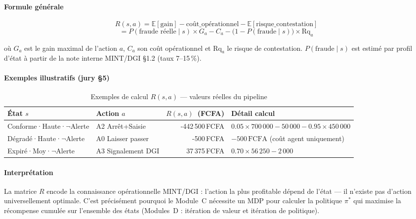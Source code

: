 \paragraph{Formule g\'{e}n\'{e}rale}
\begin{equation}
R(s,a) = \mathbb{E}[\text{gain}] - \text{co\^{u}t\_op\'{e}rationnel}
          - \mathbb{E}[\text{risque\_contestation}]
\end{equation}
\begin{equation}
= P(\text{fraude r\'{e}elle} \mid s) \times G_a
  - C_a - \bigl(1 - P(\text{fraude} \mid s)\bigr) \times \mathrm{Rq}_a
\end{equation}

o\`{u} $G_a$ est le gain maximal de l'action $a$, $C_a$ son co\^{u}t
op\'{e}rationnel et $\mathrm{Rq}_a$ le risque de contestation.
$P(\text{fraude} \mid s)$ est estim\'{e} par profil d'\'{e}tat à partir de
la note interne MINT/DGI §1.2 (taux 7--15\,\%).

\paragraph{Exemples illustratifs (jury §5)}
\begin{table}[H]
\centering
\caption{Exemples de calcul $R(s,a)$ --- valeurs r\'{e}elles du pipeline}
\label{tab:c:exemples_r}
\begin{tabular}{llrl}
\toprule
\textbf{\'{E}tat $s$} & \textbf{Action $a$} & \textbf{$R(s,a)$~(FCFA)} & \textbf{D\'{e}tail calcul} \\
\midrule
Conforme·Haute·$\neg$Alerte & A2 Arr\^{e}t+Saisie
  & -442\,500\,FCFA
  & $0.05 \times 700\,000 - 50\,000 - 0.95 \times 450\,000$ \\
D\'{e}grad\'{e}·Haute·$\neg$Alerte & A0 Laisser passer
  & -500\,FCFA
  & $-500\,\text{FCFA}$ (co\^{u}t agent uniquement) \\
Expir\'{e}·Moy·$\neg$Alerte & A3 Signalement DGI
  & 37\,375\,FCFA
  & $0.70 \times 56\,250 - 2\,000$ \\
\bottomrule
\end{tabular}
\end{table}

\paragraph{Interpr\'{e}tation}
La matrice $R$ encode la connaissance op\'{e}rationnelle MINT/DGI :
l'action la plus profitable d\'{e}pend de l'\'{e}tat --- il n'existe pas
d'action universellement optimale.
C'est pr\'{e}cis\'{e}ment pourquoi le Module~C n\'{e}cessite un MDP pour calculer
la politique $\pi^*$ qui maximise la r\'{e}compense cumul\'{e}e sur l'ensemble des
\'{e}tats (Modules~D : it\'{e}ration de valeur et it\'{e}ration de politique).
